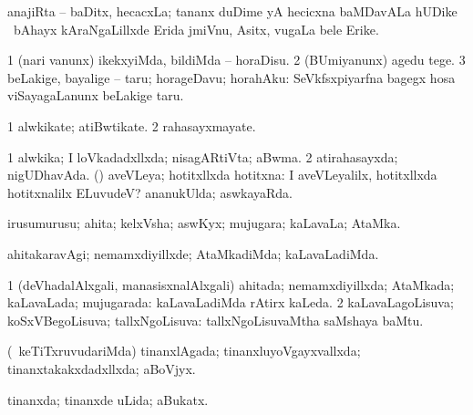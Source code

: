 {\bentry
{}
\gl{\nA}
\expl{}
\bmng
 anajiRta -- baDitx, hecacxLa; tananx duDime yA hecicxna baMDavALa hUDike \mo\ bAhayx kAraNgaLillxde Erida jmiVnu, Asitx, \mo vugaLa bele Erike. 
\emng
\eentry

\bentry
{} 
\gl{\sakirx}
\expl{}
\bmng
\bnum
\num{1} (nari \mo vanunx) ikekxyiMda, bildiMda -- horaDisu. 
\num{2} (BUmiyanunx) agedu tege. 
\num{3} beLakige, bayalige -- taru; horageDavu; horahAku:  SeVkfsxpiyarfna bagegx hosa viSayagaLanunx beLakige taru. 
\enum
\emng
\eentry

\bentry
{} 
\gl{\nA}
\expl{}
\bmng
\bnum
\num{1} alwkikate; atiBwtikate. 
\num{2} rahasayxmayate. 
\enum
\emng
\eentry

\bentry
{} 
\gl{\gu}
\bmng
\bnum
\num{1} alwkika; I loVkadadxllxda; nisagARtiVta; aBwma. 
\num{2} atirahasayxda; nigUDhavAda. 
 (\AmA) 
\banum
{} aveVLeya; hotitxllxda hotitxna:  I aveVLeyalilx, hotitxllxda hotitxnalilx ELuvudeV? 
 ananukUlda; aswkayaRda. 
\eanum
\numie
\enum
\emng
\eentry

\bentry
{} 
\gl{\nA}
\expl{}
\bmng
 irusumurusu; ahita; kelxVsha; aswKyx; mujugara; kaLavaLa; AtaMka. 
\emng
\eentry

\bentry
{} 
\gl{\kirxvi}
\expl{}
\bmng
 ahitakaravAgi; nemamxdiyillxde; AtaMkadiMda; kaLavaLadiMda. 
\emng
\eentry

\bentry
{} 
\gl{\nA}
\expl{}
\bmng
\emng
\eentry

\bentry
{} 
\gl{\gu}
\bmng
\bnum
\num{1} (deVhadalAlxgali, manasisxnalAlxgali) ahitada; nemamxdiyillxda; AtaMkada; kaLavaLada; mujugarada:  kaLavaLadiMda rAtirx kaLeda. 
\num{2} kaLavaLagoLisuva; koSxVBegoLisuva; tallxNgoLisuva:  tallxNgoLisuvaMtha saMshaya baMtu. 
\enum
\emng
\eentry

\bentry
{} 
\gl{\gu}
\expl{}
\bmng
 (\kanmu\ keTiTxruvudariMda) tinanxlAgada; tinanxluyoVgayxvallxda; tinanxtakakxdadxllxda; aBoVjyx. 
\emng
\eentry

\bentry
{} 
\gl{\gu}
\expl{}
\bmng
tinanxda; tinanxde uLida; aBukatx. 
\emng
\eentry

}
